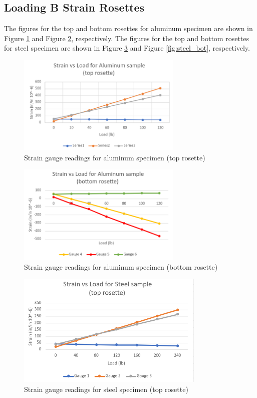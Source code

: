 \documentclass[12pt, titlepage]{article}
\begin{document}
\subsection{Loading B Strain Rosettes}
The figures for the top and bottom rosettes for aluminum specimen are shown in
Figure \ref{fig:alu_top} and Figure \ref{fig:alu_bot}, respectively. The figures
for the top and bottom rosettes for steel specimen are shown in Figure 
\ref{fig:steel_top} and Figure \ref{fig:steel_bot}, respectively.
\begin{figure}[H]
    \centering
    \includegraphics[width=0.7\textwidth]{./Images/Alu_top.png}
    \captionsetup{justification=raggedright,singlelinecheck=false}
    \caption{Strain gauge readings for aluminum specimen (top rosette)}
    \label{fig:alu_top}
\end{figure}
\begin{figure}[H]
    \centering
    \includegraphics[width=0.7\textwidth]{./Images/Alu_bot.png}
    \captionsetup{justification=raggedright,singlelinecheck=false}
    \caption{Strain gauge readings for aluminum specimen (bottom rosette)}
    \label{fig:alu_bot}
\end{figure}
\begin{figure}[H]
    \centering
    \includegraphics[width=0.8\textwidth]{./Images/S_top.png}
    \captionsetup{justification=raggedright,singlelinecheck=false}
    \caption{Strain gauge readings for steel specimen (top rosette)}
    \label{fig:steel_top}
\end{figure}
\end{document}
